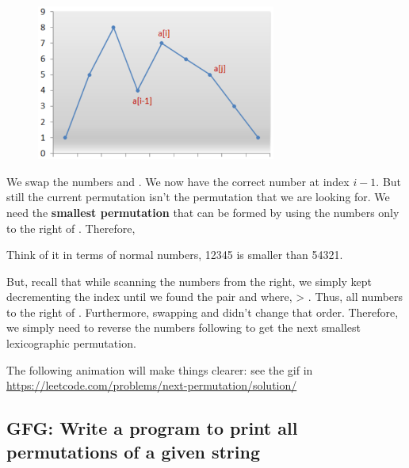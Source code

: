\begin{figure}
\centering
\includegraphics[width=0.7\textwidth]{Images/figP31NextPermutation}
\label{figP31NextPermutation}
\end{figure}

We swap the numbers  and . We now have the correct
number at index $i-1$. But still the current permutation isn't the
permutation that we are looking for. We need the \textbf{smallest
  permutation} that
can be formed by using the numbers only to the right of .
Therefore, 

 Think
of it in terms of normal numbers, 12345 is smaller than 54321.

But, recall that while scanning the numbers from the right, we simply kept
decrementing the index until we found the pair  and 
where,  > . Thus, all numbers to the right of
 . Furthermore,
swapping  and  didn't change that order. Therefore, we
simply need to reverse the numbers following  to get the next
smallest lexicographic permutation.

The following animation will make things clearer: see the gif in
\url{https://leetcode.com/problems/next-permutation/solution/}




\subsection{GFG: Write a program to print all permutations of a given string
  \label{secGFGWrtAPrgrmTPrntAllPrmttnsOfAGvnStrng}}

